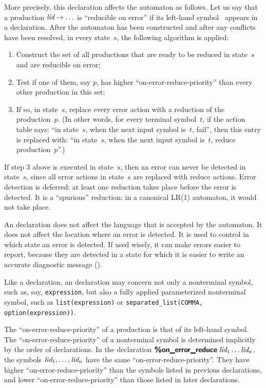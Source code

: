 \documentclass[onecolumn,11pt,nocopyrightspace,preprint]{sigplanconf}
\begin{document}
More precisely, this declaration affects the automaton as follows. Let us say
that a production $\textit{lid} \rightarrow \ldots$ is ``reducible on error'' if
its left-hand symbol~ appears in a \donerrorreduce declaration. After
the automaton has been constructed and after any conflicts have been resolved,
in every state~$s$, the following algorithm is applied:
\begin{enumerate}
\item Construct the set of all productions that are ready to be reduced in
  state~$s$ and are reducible on error;
\item Test if one of them, say $p$, has higher ``on-error-reduce-priority''
  than every other production in this set;
\item If so, in state~$s$, replace every error action with a reduction of the
  production~$p$.
(In other words, for every terminal symbol~$t$, if the action table
says: ``in state~$s$, when the next input symbol is~$t$, fail'', then this
entry is replaced with: ``in state~$s$, when the next input symbol
is~$t$, reduce production~$p$''.)
\end{enumerate}

If step 3 above is executed in state~$s$, then an error can never be detected
in state~$s$, since all error actions in state~$s$ are replaced with reduce
actions. Error detection is deferred: at least one reduction takes place
before the error is detected. It is a ``spurious'' reduction: in a canonical
LR(1) automaton, it would not take place.

An \donerrorreduce declaration does not affect the language that is accepted
by the automaton. It does not affect the location where an error is detected.
It is used to control in which state an error is detected. If used wisely, it
can make errors easier to report, because they are detected in a state for
which it is easier to write an accurate diagnostic message
().


Like a \dtype declaration, an \donerrorreduce declaration may concern not only
a nonterminal symbol, such as, say, \texttt{expression}, but also a fully
applied parameterized nonterminal symbol, such as \texttt{list(expression)} or
\texttt{separated\_list(COMMA, option(expression))}.

The ``on-error-reduce-priority'' of a production is that of its left-hand
symbol. The ``on-error-reduce-priority'' of a nonterminal symbol is determined
implicitly by the order of \donerrorreduce declarations. In the declaration
$\text{\upshape\sf\bfseries \%on\_error\_reduce}\;\textit{lid}_1 \ldots \textit{lid}_n$, the symbols $\textit{lid}_1, \ldots,
\textit{lid}_n$ have the same ``on-error-reduce-priority''. They have higher
``on-error-reduce-priority'' than the symbols listed in previous
\donerrorreduce declarations, and lower ``on-error-reduce-priority''
than those listed in later \donerrorreduce declarations.
\end{document}
